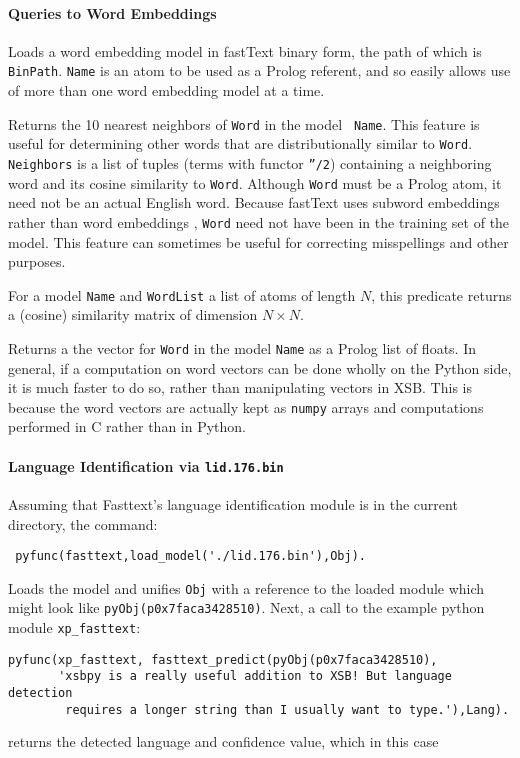 \paragraph{Queries to Word Embeddings}
\begin{description}
  Loads a word embedding model in fastText binary form, the path of
  which is {\tt BinPath}.  {\tt Name} is an atom to be used as a
  Prolog referent, and so easily allows use of more than one word
  embedding model at a time.

  Returns the 10 nearest neighbors of {\tt Word} in the model {\tt
    Name}.  This feature is useful for determining other words that
  are distributionally similar to {\tt Word}.  {\tt Neighbors} is a
  list of tuples (terms with functor {\tt ''/2}) containing a
  neighboring word and its cosine similarity to {\tt Word}.   Although
  {\tt Word} must be a Prolog atom, it need not be an actual English
  word.  Because fastText uses subword embeddings rather than word
  embeddings \cite{BGJM17}, {\tt Word} need not have been in the
  training set of the model.  This feature can sometimes be useful for
  correcting misspellings and other purposes.

  For a model {\tt Name} and {\tt WordList} a list of atoms of length
  $N$, this predicate returns a (cosine) similarity matrix of
  dimension $N \times N$.
    
  Returns a the vector for {\tt Word} in the model {\tt Name} as a
  Prolog list of floats.  In general, if a computation on word vectors
  can be done wholly on the Python side, it is much faster to do so,
  rather than manipulating vectors in XSB.  This is because the word
  vectors are actually kept as {\tt numpy} arrays and computations
  performed in C rather than in Python.
\end{description}

\paragraph{Language Identification via {\tt lid.176.bin}}
Assuming that Fasttext's language identification module is in the
current directory, the command:
\begin{verbatim}
 pyfunc(fasttext,load_model('./lid.176.bin'),Obj).
\end{verbatim}
Loads the model and unifies {\tt Obj} with a reference to the loaded
module which might look like {\tt pyObj(p0x7faca3428510)}.  
Next, a call to the example python module {\tt xp\_fasttext}:
\begin{verbatim}
pyfunc(xp_fasttext, fasttext_predict(pyObj(p0x7faca3428510),
       'xsbpy is a really useful addition to XSB! But language detection
        requires a longer string than I usually want to type.'),Lang).  
\end{verbatim}
returns the detected language and confidence value, which in this case

